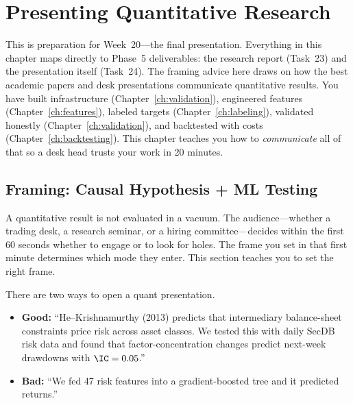 \chapter{Presenting Quantitative Research}
\label{ch:presenting}

\begin{projectconnection}
This is preparation for Week~20---the final presentation.  Everything in this
chapter maps directly to Phase~5 deliverables: the research report (Task~23)
and the presentation itself (Task~24).  The framing advice here draws on how
the best academic papers and desk presentations communicate quantitative
results.  You have built infrastructure
(Chapter~\ref{ch:validation}), engineered features
(Chapter~\ref{ch:features}), labeled targets
(Chapter~\ref{ch:labeling}), validated honestly
(Chapter~\ref{ch:validation}), and backtested with costs
(Chapter~\ref{ch:backtesting}).  This chapter teaches you how to
\emph{communicate} all of that so a desk head trusts your work in 20 minutes.
\end{projectconnection}

\section{Framing: Causal Hypothesis + ML Testing}
\label{sec:presenting:framing}

\begin{prereq}
A quantitative result is not evaluated in a vacuum.  The audience---whether a
trading desk, a research seminar, or a hiring committee---decides within the
first 60 seconds whether to engage or to look for holes.  The frame you set
in that first minute determines which mode they enter.  This section teaches
you to set the right frame.
\end{prereq}

There are two ways to open a quant presentation.

\begin{itemize}[leftmargin=1.5em]
  \item \textbf{Good:} ``He--Krishnamurthy (2013) predicts that intermediary
    balance-sheet constraints price risk across asset classes.  We tested
    this with daily SecDB risk data and found that factor-concentration
    changes predict next-week drawdowns with $\IC = 0.05$.''
  \item \textbf{Bad:} ``We fed 47 risk features into a gradient-boosted
    tree and it predicted returns.''
\end{itemize}

